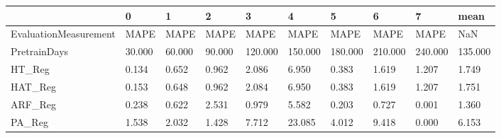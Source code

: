 \begin{tabular}{llllllllll}
\toprule
{} &      0 &      1 &      2 &       3 &       4 &       5 &       6 &       7 &    mean \\
\midrule
EvaluationMeasurement &   MAPE &   MAPE &   MAPE &    MAPE &    MAPE &    MAPE &    MAPE &    MAPE &     NaN \\
PretrainDays          & 30.000 & 60.000 & 90.000 & 120.000 & 150.000 & 180.000 & 210.000 & 240.000 & 135.000 \\
HT\_Reg                &  0.134 &  0.652 &  0.962 &   2.086 &   6.950 &   0.383 &   1.619 &   1.207 &   1.749 \\
HAT\_Reg               &  0.153 &  0.648 &  0.962 &   2.084 &   6.950 &   0.383 &   1.619 &   1.207 &   1.751 \\
ARF\_Reg               &  0.238 &  0.622 &  2.531 &   0.979 &   5.582 &   0.203 &   0.727 &   0.001 &   1.360 \\
PA\_Reg                &  1.538 &  2.032 &  1.428 &   7.712 &  23.085 &   4.012 &   9.418 &   0.000 &   6.153 \\
\bottomrule
\end{tabular}

